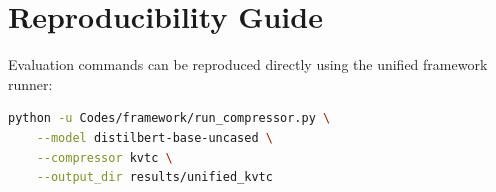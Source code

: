 \section{Reproducibility Guide}
Evaluation commands can be reproduced directly using the unified framework runner:
\begin{lstlisting}[language=bash]
python -u Codes/framework/run_compressor.py \
    --model distilbert-base-uncased \
    --compressor kvtc \
    --output_dir results/unified_kvtc
\end{lstlisting}
